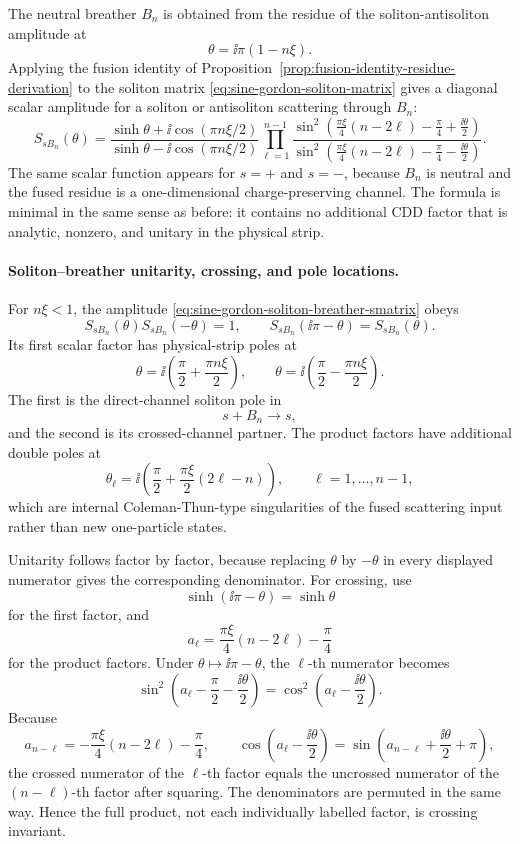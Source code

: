 The neutral breather \(B_n\) is obtained from the residue of the
soliton-antisoliton amplitude at
\[
  \theta=\ii\pi(1-n\xi).
\]
Applying the fusion identity of
Proposition~\ref{prop:fusion-identity-residue-derivation} to the soliton
matrix \eqref{eq:sine-gordon-soliton-matrix} gives a diagonal scalar amplitude
for a soliton or antisoliton scattering through \(B_n\):
\begin{equation}
  S_{sB_n}(\theta)
  =
  \frac{\sinh\theta+\ii\cos(\pi n\xi/2)}
       {\sinh\theta-\ii\cos(\pi n\xi/2)}
  \prod_{\ell=1}^{n-1}
  \frac{
    \sin^2\!\left(
      \frac{\pi\xi}{4}(n-2\ell)-\frac{\pi}{4}
      +\frac{\ii\theta}{2}
    \right)}
   {\sin^2\!\left(
      \frac{\pi\xi}{4}(n-2\ell)-\frac{\pi}{4}
      -\frac{\ii\theta}{2}
    \right)} .
  \label{eq:sine-gordon-soliton-breather-smatrix}
\end{equation}
The same scalar function appears for \(s=+\) and \(s=-\), because \(B_n\) is
neutral and the fused residue is a one-dimensional charge-preserving channel.
The formula is minimal in the same sense as before: it contains no additional
CDD factor that is analytic, nonzero, and unitary in the physical strip.

\paragraph{Soliton--breather unitarity, crossing, and pole locations.}
For \(n\xi<1\), the amplitude
\eqref{eq:sine-gordon-soliton-breather-smatrix} obeys
\[
  S_{sB_n}(\theta)S_{sB_n}(-\theta)=1,
  \qquad
  S_{sB_n}(\ii\pi-\theta)=S_{sB_n}(\theta).
\]
Its first scalar factor has physical-strip poles at
\[
  \theta=\ii\left(\frac{\pi}{2}+\frac{\pi n\xi}{2}\right),
  \qquad
  \theta=\ii\left(\frac{\pi}{2}-\frac{\pi n\xi}{2}\right).
\]
The first is the direct-channel soliton pole in
\[
  s+B_n\longrightarrow s,
\]
and the second is its crossed-channel partner.  The product factors have
additional double poles at
\[
  \theta_\ell
  =
  \ii\left(\frac{\pi}{2}
  +\frac{\pi\xi}{2}(2\ell-n)\right),
  \qquad
  \ell=1,\ldots,n-1,
\]
which are internal Coleman-Thun-type singularities of the fused scattering
input rather than new one-particle states.

Unitarity follows factor by factor, because replacing \(\theta\) by
\(-\theta\) in every displayed numerator gives the corresponding denominator.
For crossing, use
\[
  \sinh(\ii\pi-\theta)=\sinh\theta
\]
for the first factor, and
\[
  a_\ell=\frac{\pi\xi}{4}(n-2\ell)-\frac{\pi}{4}
\]
for the product factors.  Under \(\theta\mapsto\ii\pi-\theta\), the
\(\ell\)-th numerator becomes
\[
  \sin^2\!\left(a_\ell-\frac{\pi}{2}
  -\frac{\ii\theta}{2}\right)
  =
  \cos^2\!\left(a_\ell-\frac{\ii\theta}{2}\right).
\]
Because
\[
  a_{n-\ell}
  =
  -\frac{\pi\xi}{4}(n-2\ell)-\frac{\pi}{4},
  \qquad
  \cos\!\left(a_\ell-\frac{\ii\theta}{2}\right)
  =
  \sin\!\left(a_{n-\ell}
  +\frac{\ii\theta}{2}+\pi\right),
\]
the crossed numerator of the \(\ell\)-th factor equals the uncrossed numerator
of the \((n-\ell)\)-th factor after squaring.  The denominators are permuted in
the same way.  Hence the full product, not each individually labelled factor,
is crossing invariant.

